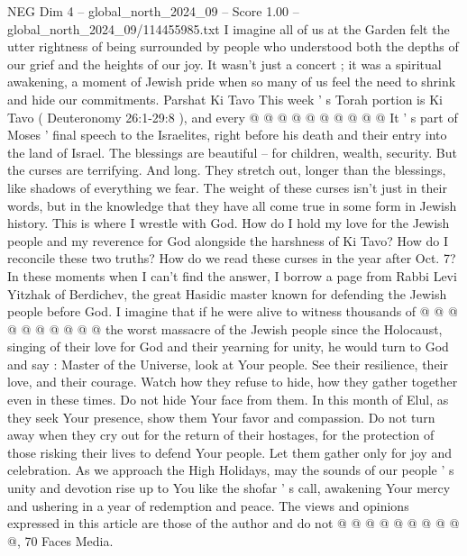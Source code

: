 \begin{textsample}{NEG Dim 4 – global\_north\_2024\_09 – Score 1.00 – global\_north\_2024\_09/114455985.txt}
I imagine all of us at the Garden felt the utter rightness of being surrounded by people who understood both the depths of our grief and the heights of our joy.
It wasn't just a concert ; it was a spiritual awakening, a moment of Jewish pride when so many of us feel the need to shrink and hide our commitments.
Parshat Ki Tavo This week ' s Torah portion is Ki Tavo ( Deuteronomy 26:1-29:8 ), and every @ @ @ @ @ @ @ @ @ @ It ' s part of Moses ' final speech to the Israelites, right before his death and their entry into the land of Israel.
The blessings are beautiful -- for children, wealth, security.
But the curses are terrifying.
And long.
They stretch out, longer than the blessings, like shadows of everything we fear.
The weight of these curses isn't just in their words, but in the knowledge that they have all come true in some form in Jewish history.
This is where I wrestle with God.
How do I hold my love for the Jewish people and my reverence for God alongside the harshness of Ki Tavo?
How do I reconcile these two truths?
How do we read these curses in the year after Oct. 7?
In these moments when I can't find the answer, I borrow a page from Rabbi Levi Yitzhak of Berdichev, the great Hasidic master known for defending the Jewish people before God.
I imagine that if he were alive to witness thousands of @ @ @ @ @ @ @ @ @ @ the worst massacre of the Jewish people since the Holocaust, singing of their love for God and their yearning for unity, he would turn to God and say : Master of the Universe, look at Your people.
See their resilience, their love, and their courage.
Watch how they refuse to hide, how they gather together even in these times.
Do not hide Your face from them.
In this month of Elul, as they seek Your presence, show them Your favor and compassion.
Do not turn away when they cry out for the return of their hostages, for the protection of those risking their lives to defend Your people.
Let them gather only for joy and celebration.
As we approach the High Holidays, may the sounds of our people ' s unity and devotion rise up to You like the shofar ' s call, awakening Your mercy and ushering in a year of redemption and peace.
The views and opinions expressed in this article are those of the author and do not @ @ @ @ @ @ @ @ @ @, 70 Faces Media.

\end{textsample}
